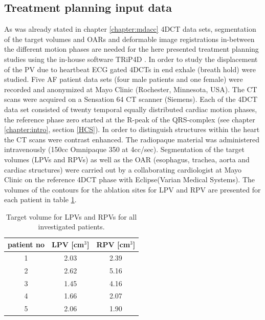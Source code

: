 \subsection{Treatment planning input data}
As was already stated in chapter \ref{chapter:mdacc} 4DCT data sets, segmentation of the target volumes and OARs and deformable image 
registrations in-between the different motion phases are needed for the here presented treatment planning studies using the in-house software 
TRiP4D \cite{Ric13}.\newline
\newline
In order to study the displacement of the PV due to heartbeat ECG gated 4DCTs in end exhale (breath hold) were studied. 
Five AF patient data sets (four male patients and one female) were recorded and anonymized at Mayo Clinic (Rochester, Minnesota, USA). 
The CT scans were acquired on a Sensation 64 CT scanner (Siemens). Each of the 4DCT data set consisted of twenty temporal equally distributed 
cardiac motion phases, the reference phase zero started at the R-peak of the QRS-complex (see chapter \ref{chapter:intro}, section \ref{HCS}). 
In order to distinguish structures within the heart the CT scans were contrast enhanced. The radiopaque material was administered intravenously (150cc Omnipaque 350 at 4cc/sec). 
Segmentation of the target volumes (LPVs and RPVs) as well as the OAR (esophagus, trachea, aorta and cardiac structures) were carried out by a 
collaborating cardiologist at Mayo Clinic on the reference 4DCT phase with Eclipse\texttrademark (Varian Medical Systems). The volumes of the 
contours for the ablation sites for LPV and RPV are presented for each patient in table \ref{tab:volume:mayo}. 

\begin{table}[htbp]
  \centering
  \caption{Target volume for LPVs and RPVs for all investigated patients.}
  \begin{tabular}{|c|c|c|}
    \hline\hline
    patient no\rule{0pt}{2.6ex}\rule[-1.2ex]{0pt}{0pt} & LPV [cm$^{3}$] & RPV [cm$^{3}$]\\
    \hline
    1 & 2.03 & 2.39 \\
    2 & 2.62 & 5.16 \\
    3 & 1.45 & 4.16 \\
    4 & 1.66 & 2.07 \\
    5 & 2.06 & 1.90 \\
    \hline\hline
  \end{tabular}
  \label{tab:volume:mayo}
\end{table}

